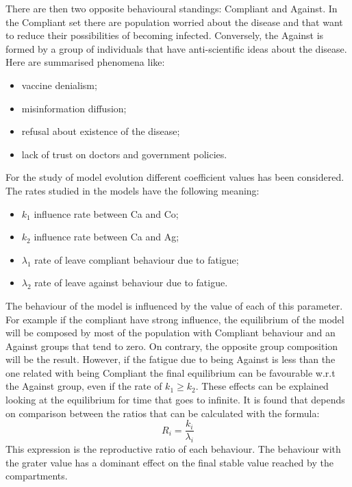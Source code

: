 There are then two opposite behavioural standings: Compliant and Against.
In the Compliant set there are population worried about the disease and that want to reduce their possibilities of becoming infected. Conversely, the Against is formed by a group of individuals that have anti-scientific ideas about the disease. Here are summarised phenomena like:
\begin{itemize}
		\item vaccine denialism;
		\item misinformation diffusion;
		\item refusal about existence of the disease;
		\item lack of trust on doctors and government policies.
\end{itemize}

For the study of model evolution different coefficient values has been considered.  The rates studied in the models have the following meaning:
\begin{itemize}
	\item $k_1$ influence rate between Ca and Co;
	\item $k_2$ influence rate between Ca and Ag;
	\item $\lambda_1$ rate of leave compliant behaviour due to fatigue;
	\item $\lambda_2$ rate of leave against behaviour due to fatigue.
\end{itemize}

The behaviour of the model is influenced by the value of each of this parameter. For example if the compliant have strong influence, the equilibrium of the model will be composed by most of the population with Compliant behaviour and an Against groups that tend to zero. On contrary, the opposite group composition will be the result. However, if the fatigue due to being Against is less than the one related with being Compliant the final equilibrium can be favourable w.r.t the Against group, even if the rate of $k_1 \ge k_2$.
These effects can be explained looking at the equilibrium for time that goes to infinite. It is found that depends on comparison between the ratios that can be calculated with the formula: 
\begin{equation}
	R_i =\frac{ k_i }{\lambda_i}
	\label{eq:behave_rate}
\end{equation}
This expression is the reproductive ratio of each behaviour. The behaviour with the grater value has a dominant effect on the final stable value reached by the compartments.

